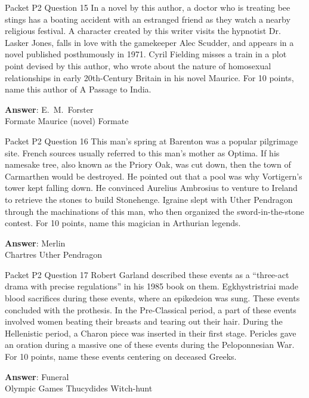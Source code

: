 \begin{frame}{Packet P2 Question 15}
In a novel by this author, a doctor who is treating bee stings has a boating accident   with an estranged friend as they watch a nearby religious festival. A character created by this writer visits the hypnotist Dr. Lasker Jones,   falls in love with the gamekeeper Alec Scudder, and appears   in a novel published posthumously in 1971. Cyril Fielding misses a train in a plot point devised by this author, who wrote about the nature of homosexual relationships in early 20th-Century Britain in his novel Maurice.   For 10 points, name this author of A Passage to India.    

\textbf{Answer}: E.\ M.\ Forster\\
 Formate
 Maurice (novel)
 Formate
\end{frame}

\begin{frame}{Packet P2 Question 16}
This man’s spring at Barenton was a popular pilgrimage site. French sources usually   referred to this man’s mother as Optima. If his namesake tree, also known as the Priory Oak, was cut down, then the town of Carmarthen would be destroyed. He pointed out that a pool was why Vortigern’s tower kept falling     down. He convinced Aurelius Ambrosius   to venture to Ireland to retrieve the stones to build Stonehenge.   Igraine slept with Uther Pendragon through the machinations   of this man, who then organized the sword-in-the-stone contest. For 10 points, name this magician in Arthurian legends.

\textbf{Answer}: Merlin\\
 Chartres
 Uther Pendragon
\end{frame}

\begin{frame}{Packet P2 Question 17}
Robert Garland described these events as a ``three-act drama with precise regulations'' in his 1985 book on them. Egkhystristriai made blood sacrifices during these events, where an epikedeion was sung. These events concluded with the prothesis. In the Pre-Classical period, a part of these events involved women beating their breasts and tearing out their hair. During the Hellenistic   period, a Charon piece was inserted in their first stage. Pericles gave an oration during a massive one of these events during the Peloponnesian War. For 10 points, name these events centering on deceased Greeks.      

\textbf{Answer}: Funeral\\
 Olympic Games
 Thucydides
 Witch-hunt
\end{frame}

